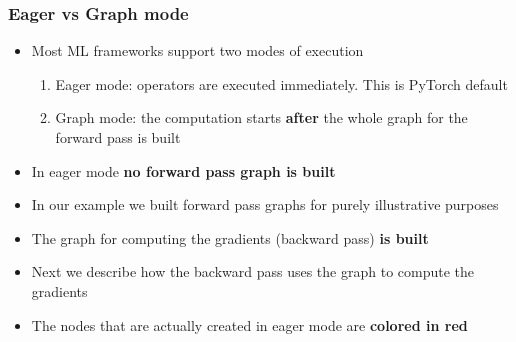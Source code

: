 \documentclass{beamer}
\theoremstyle{plain} %
\theoremstyle{example} %
\begin{document}
\begin{frame}
    \frametitle{Eager vs Graph mode}
\begin{itemize}
    \item Most ML frameworks support two modes of execution
    \begin{enumerate}
        \item Eager mode: operators are executed immediately. This is PyTorch default
        \item Graph mode: the computation starts \textbf{after} the whole  graph for the forward pass is built 
    \end{enumerate}
    \item In eager mode \textbf{no forward pass graph is built}
    \item In our example we built forward pass graphs for purely  illustrative purposes
    \item The graph for computing the gradients (backward pass) \textbf{is built}
    \item Next we describe how the backward pass uses the graph to compute the gradients
    \item The nodes that are actually created in eager mode are \textbf{colored in red}
\end{itemize}
\end{frame}
\end{document}
